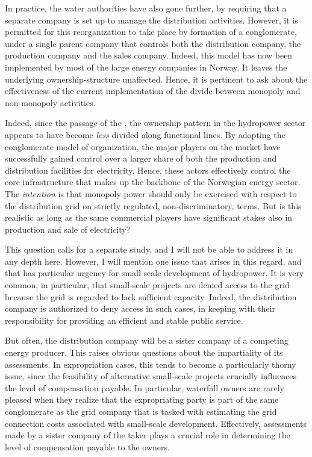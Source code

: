In practice, the water authorities have also gone further, by requiring that a separate company is set up to manage the distribution activities. However, it is permitted for this reorganization to take place by formation of a conglomerate, under a single parent company that controls both the distribution company, the production company and the sales company. Indeed, this model has now been implemented by most of the large energy companies in Norway. It leaves the underlying ownership-structure unaffected. Hence, it is pertinent to ask about the effectiveness of the current implementation of the divide between monopoly and non-monopoly activities. 

Indeed, since the passage of the \cite{ea90}, the ownership pattern in the hydropower sector appears to have become {\it less} divided along functional lines. By adopting the conglomerate model of organization, the major players on the market have successfully gained control over a larger share of both the production and distribution facilities for electricity. Hence, these actors effectively control the core infrastructure that makes up the backbone of the Norwegian energy sector. The {\it intention} is that monopoly power should only be exercised with respect to the distribution grid on strictly regulated, non-discriminatory, terms. But is this realistic as long as the same commercial players have significant stakes also in production and sale of electricity? 

This question calls for a separate study, and I will not be able to address it in any depth here. However, I will mention one issue that arises in this regard, and that has particular urgency for small-scale development of hydropower. It is very common, in particular, that small-scale projects are denied access to the grid because the grid is regarded to lack sufficient capacity. Indeed, the distribution  company is authorized to deny access in such cases, in keeping with their responsibility for providing an efficient and stable public service. 

But often, the distribution company will be a sister company of a competing energy producer. This raises obvious questions about the impartiality of its assessments. In expropriation cases, this tends to become a particularly thorny issue, since the feasibility of alternative small-scale projects crucially influences the level of compensation payable. In particular, waterfall owners are rarely pleased when they realize that the expropriating party is part of the same conglomerate as the grid company that is tasked with estimating the grid connection costs associated with small-scale development. Effectively, assessments made by a sister company of the taker plays a crucial role in determining the level of compensation payable to the owners.

